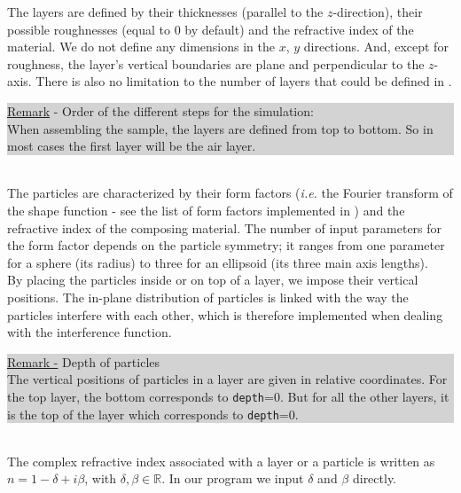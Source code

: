 \noindent The layers are defined by their thicknesses (parallel to the
$z$-direction), their possible
roughnesses (equal to 0 by default) and the refractive index of the
material. We do not define any dimensions in the $x$, $y$
directions. And, except for roughness, the layer's vertical boundaries are plane and
perpendicular to the $z$-axis. There is also no limitation to the
number of layers that could be defined in \BornAgain.\\

\noindent {\huge\danger} 
\colorbox{Lightgray}{\parbox{\dimexpr\linewidth-8\fboxsep}
{\underline{Remark} - Order of the different steps for the simulation: \\
When assembling the sample, the layers are defined from top to
bottom. So in most cases the first layer will be the air layer.}}\\

\noindent The particles are characterized by their form factors (\textit{i.e.} the Fourier transform of the shape function - see the list of form factors implemented
  in \BornAgain) and
the refractive index of the composing material. The number of input parameters for the form
  factor depends on the
  particle symmetry; it ranges from one parameter for a sphere (its
  radius) to three for an ellipsoid (its three main axis lengths).\\ By
  placing the particles
inside or on top of a layer, we impose their vertical positions. The in-plane distribution of particles is linked with the way the
particles interfere with each other, which is therefore implemented
when dealing with the interference function. \\

\noindent {\huge\danger} 
\colorbox{Lightgray}{\parbox{\dimexpr\linewidth-8\fboxsep}
{\underline{Remark -} Depth of particles\\
The vertical positions of particles in a layer are given in relative
coordinates. For the top layer, the bottom corresponds to
\texttt{depth}=0. But for all the other layers, it is the top of the
layer which corresponds to \texttt{depth}=0.}}\\


\noindent The complex refractive index associated with a layer or a particle is written as $n=1-\delta +i\beta$, with
$\delta, \beta \in \mathbb{R}$. In our program we input $\delta$ and
$\beta$ directly. \\


